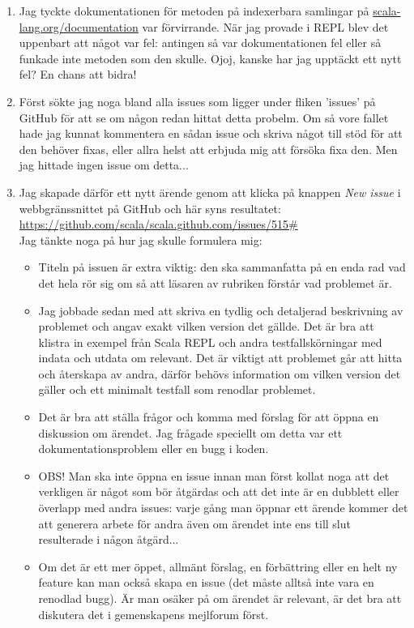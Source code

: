 \begin{enumerate}

\item Jag tyckte dokumentationen för metoden  på indexerbara samlingar på \href{http://scala-lang.org/documentation/}{scala-lang.org/documentation} var förvirrande. När jag provade i REPL blev det uppenbart att något var fel: antingen så var dokumentationen fel eller så funkade inte metoden som den skulle. Ojoj, kanske har jag upptäckt ett nytt fel? En chans att bidra!

\item Först sökte jag noga bland alla issues som ligger under fliken 'issues' på GitHub för att se om någon redan hittat detta probelm. Om så vore fallet hade jag kunnat kommentera en sådan issue och skriva något till stöd för att den behöver fixas, eller allra helst att erbjuda mig att försöka fixa den. Men jag hittade ingen issue om detta...

\item Jag skapade därför ett nytt ärende genom att klicka på knappen \emph{New issue} i webbgränssnittet på GitHub och här syns resultatet: \\ \url{https://github.com/scala/scala.github.com/issues/515#} \\ Jag tänkte noga på hur jag skulle formulera mig: 

\begin{itemize}[nolistsep, noitemsep]
  \item Titeln på issuen är extra viktig: den ska sammanfatta på en enda rad vad det hela rör sig om så att läsaren av rubriken förstår vad problemet är. 
  \item Jag jobbade sedan med att skriva en tydlig och detaljerad beskrivning av problemet och angav exakt vilken version det gällde. Det är bra att klistra in exempel från Scala REPL och andra testfallskörningar med indata och utdata om relevant. Det är viktigt att problemet går att hitta och återskapa av andra, därför behövs information om vilken version det gäller och ett minimalt testfall som renodlar problemet.
  \item Det är bra att ställa frågor och komma med förslag för att öppna en diskussion om ärendet. Jag frågade speciellt om detta var ett dokumentationsproblem eller en bugg i koden.
  \item OBS! Man ska inte öppna en issue innan man först kollat noga att det verkligen är något som bör åtgärdas och att det inte är en dubblett eller överlapp med andra issues: varje gång man öppnar ett ärende kommer det att generera arbete för andra även om ärendet inte ens till slut resulterade i någon åtgärd... 
  \item Om det är ett mer öppet, allmänt förslag, en förbättring eller en helt ny feature kan man också skapa en issue (det måste alltså inte vara en renodlad bugg). Är man osäker på om ärendet är relevant, är det bra att diskutera det i gemenskapens mejlforum först.
\end{itemize}


\end{enumerate}
